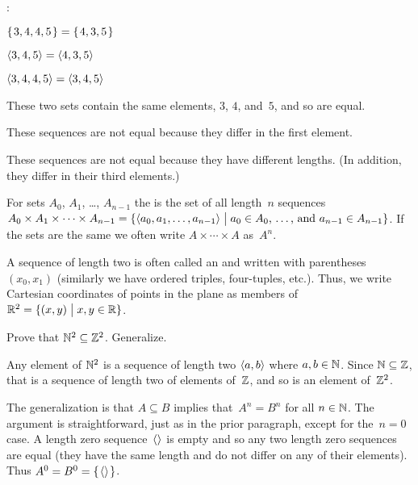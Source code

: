 \documentclass{ibl}  %
\begin{document}
\begin{ex}\pord:
\begin{items}
\item $\mbox{$\{\hspace{0.1em}3, 4, 4, 5\hspace{0.1em}\}$}=\mbox{$\{\hspace{0.1em}4, 3, 5\hspace{0.1em}\}$}$
\item $\langle3, 4, 5\rangle=\langle4, 3, 5\rangle$
\item $\langle3, 4, 4, 5\rangle=\langle3,4,5\rangle$  
\end{items}
\begin{ans}
\begin{items}
\item These two sets contain the same elements, $3$, $4$, and~$5$,
  and so are equal.
\item These sequences are not equal because they differ in the first element.
\item These sequences are not equal because they have different lengths.
  (In addition, they differ in their third elements.)
\end{items}
\end{ans}
\end{ex}

\begin{df}
For sets $A_0$, $A_1$, \ldots, $A_{n-1}$
the  
is the set of all length~$n$ sequences
$A_0\times A_1\times \cdots \times A_{n-1}
  =\{\langle a_0,a_1,\ldots,a_{n-1}\rangle \bigm| \text{$a_0\in A_0$, \ldots, and~$a_{n-1}\in A_{n-1}$}\}$.
If the sets are the same we often write $A\times\cdots\times A$ 
as~$A^n$.
\end{df}

A sequence of length two is often called an  and 
written with parentheses $(x_0,x_1)$
(similarly we have ordered triples, four-tuples, etc.).
Thus, we write 
Cartesian coordinates of points in the plane as members of
$\mathbb{R}^2=\{(x,y) \bigm| x,y\in\mathbb{R}\}$.

\begin{ex}
Prove that $\mathbb{N}^2\subseteq \mathbb{Z}^2$.
Generalize. 
\begin{ans}
Any element of $\mathbb{N}^2$ is a sequence of length two $\langle a,b\rangle$ where
$a,b\in\mathbb{N}$.
Since $\mathbb{N}\subseteq\mathbb{Z}$, that is a sequence of length two of elements of~$\mathbb{Z}$, 
and so is an element of~$\mathbb{Z}^2$.

The generalization is that $A\subseteq B$ implies that~$A^n=B^n$ for all 
$n\in\mathbb{N}$.
The argument is straightforward, just as in the prior paragraph,
except for the~$n=0$ case.
A length zero sequence~$\langle\rangle$ is empty and so any two 
length zero sequences are equal (they have the same length and do not 
differ on any of their elements).
Thus $A^0=B^0=\mbox{$\{\hspace{0.1em}\langle\rangle\hspace{0.1em}\}$}$.
\end{ans}
\end{ex}
\end{document}
